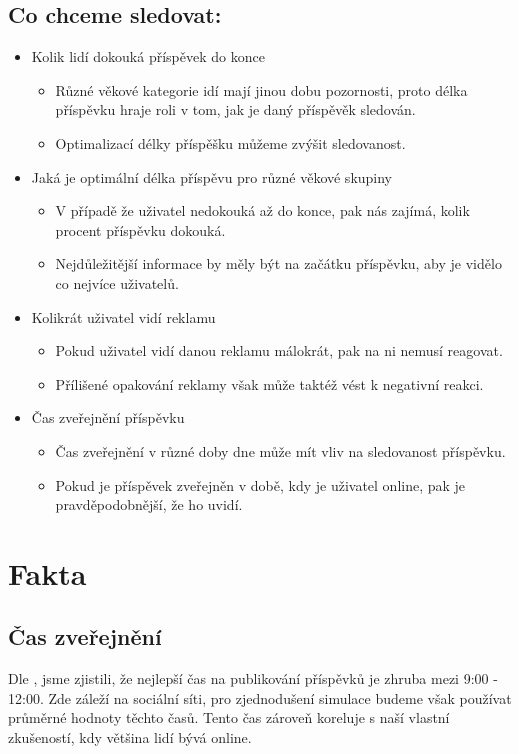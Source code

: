 \documentclass[11pt, a4paper]{article}
\begin{document}
\subsection{Co chceme sledovat:}
\begin{itemize}
    \item Kolik lidí dokouká příspěvek do konce
    \begin{itemize}
        \item Různé věkové kategorie idí mají jinou dobu pozornosti, proto délka příspěvku hraje roli v tom, jak je daný příspěvěk sledován.
        \item Optimalizací délky příspěšku můžeme zvýšit sledovanost.
    \end{itemize}
    \item Jaká je optimální délka příspěvu pro různé věkové skupiny
    \begin{itemize}
        \item V případě že uživatel nedokouká až do konce, pak nás zajímá, kolik procent příspěvku dokouká.
        \item Nejdůležitější informace by měly být na začátku příspěvku, aby je vidělo co nejvíce uživatelů.
    \end{itemize}
    \item Kolikrát uživatel vidí reklamu
    \begin{itemize}
        \item Pokud uživatel vidí danou reklamu málokrát, pak na ni nemusí reagovat.
        \item Přílišené opakování reklamy však může taktéž vést k negativní reakci.
    \end{itemize}
    \item Čas zveřejnění příspěvku 
    \begin{itemize}
        \item Čas zveřejnění v různé doby dne může mít vliv na sledovanost příspěvku.
        \item Pokud je příspěvek zveřejněn v době, kdy je uživatel online, pak je pravděpodobnější, že ho uvidí.
    \end{itemize}
\end{itemize}

\newpage
\section{Fakta}

\subsection{Čas zveřejnění}
Dle \cite{TimeToPost}, jsme zjistili, že nejlepší čas na publikování příspěvků je zhruba mezi 9:00 - 12:00. Zde záleží na sociální síti, 
pro zjednodušení simulace budeme však používat průměrné hodnoty těchto časů.
Tento čas zároveň koreluje s naší vlastní zkušeností, kdy většina lidí bývá online.
\end{document}
